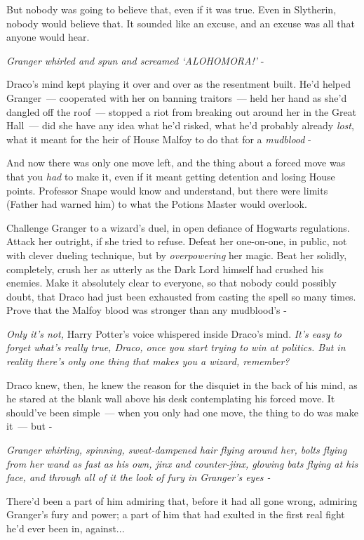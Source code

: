 But nobody was going to believe that, even if it was true. Even in Slytherin, nobody would believe that. It sounded like an excuse, and an excuse was all that anyone would hear.

\emph{Granger whirled and spun and screamed `ALOHOMORA!'} -

Draco's mind kept playing it over and over as the resentment built. He'd helped Granger~--- cooperated with her on banning traitors~--- held her hand as she'd dangled off the roof~--- stopped a riot from breaking out around her in the Great Hall~--- did she have any idea what he'd risked, what he'd probably already \emph{lost}, what it meant for the heir of House Malfoy to do that for a \emph{mudblood} -

And now there was only one move left, and the thing about a forced move was that you \emph{had} to make it, even if it meant getting detention and losing House points. Professor Snape would know and understand, but there were limits (Father had warned him) to what the Potions Master would overlook.

Challenge Granger to a wizard's duel, in open defiance of Hogwarts regulations. Attack her outright, if she tried to refuse. Defeat her one-on-one, in public, not with clever dueling technique, but by \emph{overpowering} her magic. Beat her solidly, completely, crush her as utterly as the Dark Lord himself had crushed his enemies. Make it absolutely clear to everyone, so that nobody could possibly doubt, that Draco had just been exhausted from casting the spell so many times. Prove that the Malfoy blood was stronger than any mudblood's -

\emph{Only it's not,} Harry Potter's voice whispered inside Draco's mind. \emph{It's easy to forget what's really true, Draco, once you start trying to win at politics. But in reality there's only one thing that makes you a wizard, remember?}

Draco knew, then, he knew the reason for the disquiet in the back of his mind, as he stared at the blank wall above his desk contemplating his forced move. It should've been simple~--- when you only had one move, the thing to do was make it~--- but -

\emph{Granger whirling, spinning, sweat-dampened hair flying around her, bolts flying from her wand as fast as his own, jinx and counter-jinx, glowing bats flying at his face, and through all of it the look of fury in Granger's eyes -}

There'd been a part of him admiring that, before it had all gone wrong, admiring Granger's fury and power; a part of him that had exulted in the first real fight he'd ever been in, against...

